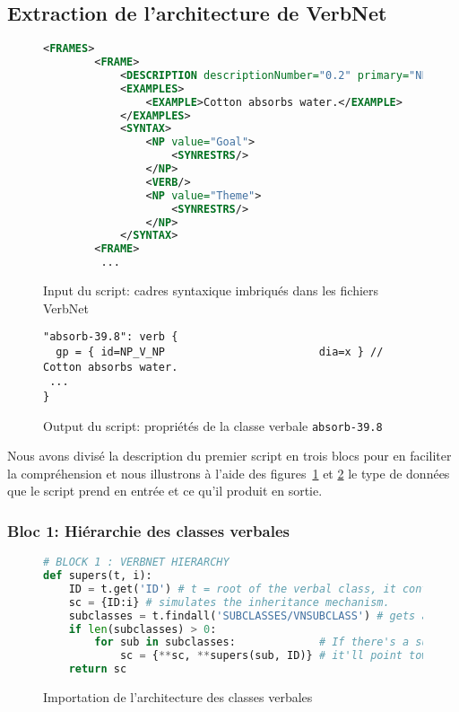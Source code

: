 
\subsection{Extraction de l'architecture de VerbNet}

\begin{figure}[htb]
 \caption{Input du script: cadres syntaxique imbriqués dans les fichiers VerbNet}
 \label{fig:input-absorb}
\begin{lstlisting}[language=XML]
<FRAMES>
        <FRAME>
            <DESCRIPTION descriptionNumber="0.2" primary="NP V NP" secondary="Basic Transitive"/>
            <EXAMPLES>
                <EXAMPLE>Cotton absorbs water.</EXAMPLE>
            </EXAMPLES>
            <SYNTAX>
                <NP value="Goal">
                    <SYNRESTRS/>
                </NP>
                <VERB/>
                <NP value="Theme">
                    <SYNRESTRS/>
                </NP>
            </SYNTAX>
		<FRAME>
         ...
\end{lstlisting}
\end{figure}

\begin{figure}[htb]
  \caption{Output du script: propriétés de la classe verbale \texttt{absorb-39.8}}
	\label{fig:output-absorb}
\begin{lstlisting}[language=mate]
"absorb-39.8": verb {
  gp = { id=NP_V_NP                        dia=x } // Cotton absorbs water.
 ...
}
\end{lstlisting}
\end{figure}

Nous avons divisé la description du premier script en trois blocs pour en faciliter la compréhension et nous illustrons à l'aide des figures~\ref{fig:input-absorb} et \ref{fig:output-absorb} le type de données que le script prend en entrée et ce qu'il produit en sortie.

\subsubsection{Bloc 1: Hiérarchie des classes verbales}

\begin{figure}[htb]
  \caption{Importation de l'architecture des classes verbales}
	\label{fig:archivn-bloc1}
\begin{lstlisting}[language=Python]
# BLOCK 1 : VERBNET HIERARCHY
def supers(t, i):
    ID = t.get('ID') # t = root of the verbal class, it contains the shared syntactic information.
    sc = {ID:i} # simulates the inheritance mechanism.
    subclasses = t.findall('SUBCLASSES/VNSUBCLASS') # gets all the information on the subclasses.
    if len(subclasses) > 0:
        for sub in subclasses:             # If there's a subclass for a given VNCLASS, 
            sc = {**sc, **supers(sub, ID)} # it'll point towards the class it's being dominated by.
    return sc
\end{lstlisting}
\end{figure}

